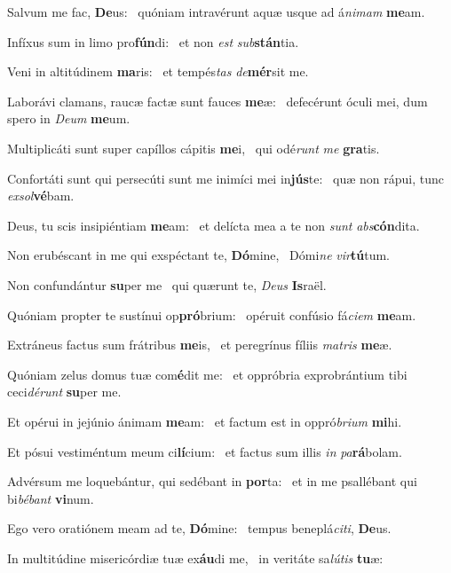 \item Salvum me fac, \textbf{De}us:~\psstar{} quóniam intravérunt aquæ usque ad á\textit{nimam} \textbf{me}am.
\item Infíxus sum in limo pro\textbf{fún}di:~\psstar{} et non \textit{est} \textit{sub}\textbf{stán}tia.
\item Veni in altitúdinem \textbf{ma}ris:~\psstar{} et tempés\textit{tas} \textit{de}\textbf{mér}sit me.
\item Laborávi clamans, raucæ factæ sunt fauces \textbf{me}æ:~\psstar{} defecérunt óculi mei, dum spero in \textit{Deum} \textbf{me}um.
\item Multiplicáti sunt super capíllos cápitis \textbf{me}i,~\psstar{} qui odé\textit{runt} \textit{me} \textbf{gra}tis.
\item Confortáti sunt qui persecúti sunt me inimíci mei in\textbf{jús}te:~\psstar{} quæ non rápui, tunc \textit{exsol}\textbf{vé}bam.
\item Deus, tu scis insipiéntiam \textbf{me}am:~\psstar{} et delícta mea a te non \textit{sunt} \textit{abs}\textbf{cón}dita.
\item Non erubéscant in me qui exspéctant te, \textbf{Dó}mine,~\psstar{} Dómi\textit{ne} \textit{vir}\textbf{tú}tum.
\item Non confundántur \textbf{su}per me~\psstar{} qui quærunt te, \textit{Deus} \textbf{Is}raël.
\item Quóniam propter te sustínui op\textbf{pró}brium:~\psstar{} opéruit confúsio fá\textit{ciem} \textbf{me}am.
\item Extráneus factus sum frátribus \textbf{me}is,~\psstar{} et peregrínus fíliis \textit{matris} \textbf{me}æ.
\item Quóniam zelus domus tuæ com\textbf{é}dit me:~\psstar{} et oppróbria exprobrántium tibi ceci\textit{dérunt} \textbf{su}per me.
\item Et opérui in jejúnio ánimam \textbf{me}am:~\psstar{} et factum est in oppró\textit{brium} \textbf{mi}hi.
\item Et pósui vestiméntum meum ci\textbf{lí}cium:~\psstar{} et factus sum illis \textit{in} \textit{pa}\textbf{rá}bolam.
\item Advérsum me loquebántur, qui sedébant in \textbf{por}ta:~\psstar{} et in me psallébant qui bi\textit{bébant} \textbf{vi}num.
\item Ego vero oratiónem meam ad te, \textbf{Dó}mine:~\psstar{} tempus beneplá\textit{citi}, \textbf{De}us.
\item In multitúdine misericórdiæ tuæ ex\textbf{áu}di me,~\psstar{} in veritáte sa\textit{lútis} \textbf{tu}æ:
